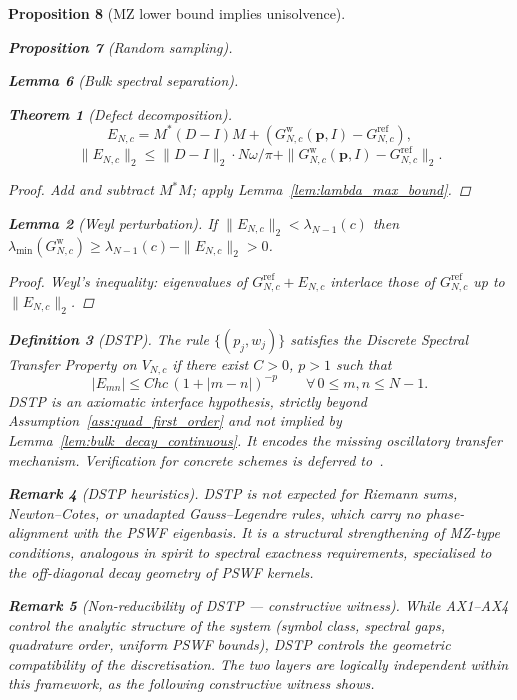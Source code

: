 \documentclass[12pt,a4paper]{amsart}
\newtheorem{theorem}{Theorem}[section]
\newtheorem{lemma}[theorem]{Lemma}
\newtheorem{proposition}[theorem]{Proposition}
\theoremstyle{definition}
\newtheorem{definition}[theorem]{Definition}
\newtheorem{remark}[theorem]{Remark}
\newcommand{\EN}{E_{N,c}}
\newcommand{\norm}[1]{\|#1\|}
\begin{document}
\begin{proposition}[MZ lower bound implies unisolvence]
\begin{proposition}[Random sampling]
\begin{lemma}[Bulk spectral separation]
\begin{theorem}[Defect decomposition]\label{thm:main_reduction}
\[
  \EN=M^*(D-I)M+(G^{\mathrm{w}}_{N,c}(\mathbf{p},I)
     -G^{\mathrm{ref}}_{N,c}),
\]
\[
  \norm{\EN}_2\le\norm{D-I}_2\cdot N\omega/\pi
  +\norm{G^{\mathrm{w}}_{N,c}(\mathbf{p},I)
         -G^{\mathrm{ref}}_{N,c}}_2.
\]
\end{theorem}
\begin{proof}
Add and subtract $M^*M$; apply Lemma~\ref{lem:lambda_max_bound}.
\end{proof}

\begin{lemma}[Weyl perturbation]\label{lem:weyl}
If $\norm{\EN}_2<\lambda_{N-1}(c)$ then
$\lambda_{\min}(G^{\mathrm{w}}_{N,c})
\ge\lambda_{N-1}(c)-\norm{\EN}_2>0$.
\end{lemma}
\begin{proof}
Weyl's inequality: eigenvalues of $G^{\mathrm{ref}}_{N,c}+\EN$
interlace those of $G^{\mathrm{ref}}_{N,c}$ up to $\norm{\EN}_2$.
\end{proof}

\begin{definition}[DSTP]\label{def:dstp}
The rule $\{(p_j,w_j)\}$ satisfies the \emph{Discrete Spectral
Transfer Property} on $V_{N,c}$ if there exist $C>0$, $p>1$ such that
\[
  |E_{mn}|\le Chc\,(1+|m-n|)^{-p}
  \qquad\forall\,0\le m,n\le N-1.
\]
DSTP is an axiomatic interface hypothesis, strictly beyond
Assumption~\ref{ass:quad_first_order} and not implied by
Lemma~\ref{lem:bulk_decay_continuous}. It encodes the missing
oscillatory transfer mechanism. Verification for concrete schemes
is deferred to~\cite{PaperIIquad}.
\end{definition}

\begin{remark}[DSTP heuristics]
DSTP is not expected for Riemann sums, Newton--Cotes, or unadapted
Gauss--Legendre rules, which carry no phase-alignment with the PSWF
eigenbasis. It is a structural strengthening of MZ-type conditions,
analogous in spirit to spectral exactness requirements, specialised
to the off-diagonal decay geometry of PSWF kernels.
\end{remark}

\begin{remark}[Non-reducibility of \textup{DSTP} --- constructive witness]
\label{rem:ax5_independence}
While \textup{AX1--AX4} control the \emph{analytic} structure of the
system (symbol class, spectral gaps, quadrature order, uniform PSWF
bounds), DSTP controls the \emph{geometric} compatibility of the
discretisation. The two layers are logically independent within this
framework, as the following constructive witness shows.


\end{remark}
\end{lemma}
\end{proposition}
\end{proposition}
\end{document}
